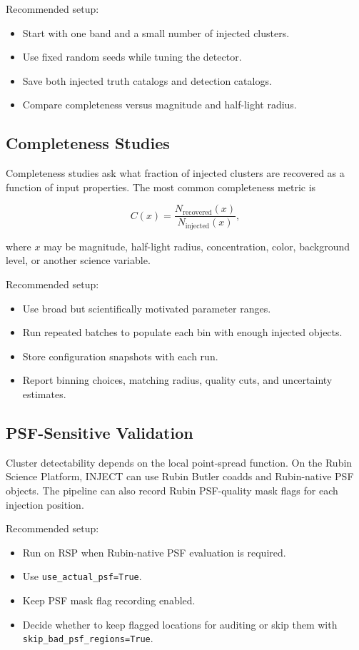 \documentclass[11pt]{article}
\begin{document}
Recommended setup:
\begin{itemize}[leftmargin=*]
    \item Start with one band and a small number of injected clusters.
    \item Use fixed random seeds while tuning the detector.
    \item Save both injected truth catalogs and detection catalogs.
    \item Compare completeness versus magnitude and half-light radius.
\end{itemize}

\subsection{Completeness Studies}

Completeness studies ask what fraction of injected clusters are recovered as a function of input properties. The most common completeness metric is

\begin{equation}
    C(x) = \frac{N_{\mathrm{recovered}}(x)}{N_{\mathrm{injected}}(x)},
\end{equation}

where $x$ may be magnitude, half-light radius, concentration, color, background level, or another science variable.

Recommended setup:
\begin{itemize}[leftmargin=*]
    \item Use broad but scientifically motivated parameter ranges.
    \item Run repeated batches to populate each bin with enough injected objects.
    \item Store configuration snapshots with each run.
    \item Report binning choices, matching radius, quality cuts, and uncertainty estimates.
\end{itemize}

\subsection{PSF-Sensitive Validation}

Cluster detectability depends on the local point-spread function. On the Rubin Science Platform, INJECT can use Rubin Butler coadds and Rubin-native PSF objects. The pipeline can also record Rubin PSF-quality mask flags for each injection position.

Recommended setup:
\begin{itemize}[leftmargin=*]
    \item Run on RSP when Rubin-native PSF evaluation is required.
    \item Use \texttt{use\_actual\_psf=True}.
    \item Keep PSF mask flag recording enabled.
    \item Decide whether to keep flagged locations for auditing or skip them with \texttt{skip\_bad\_psf\_regions=True}.
\end{itemize}
\end{document}
